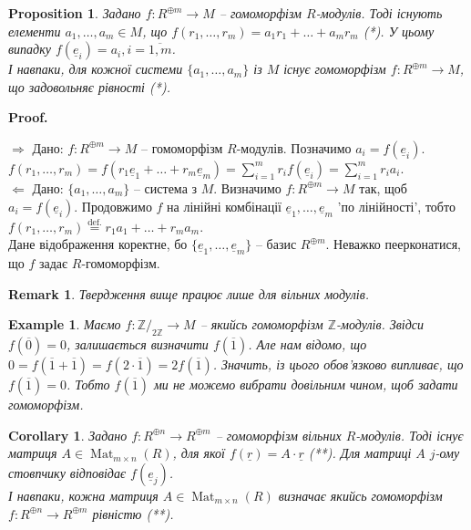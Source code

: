 \documentclass[a4paper, 10pt]{article}
\makeatletter
\def\rightproof{$\boxed{\Rightarrow}$ }
\def\leftproof{$\boxed{\Leftarrow}$ }
\theoremstyle{theoremdd}
\theoremstyle{theoremdd}
\theoremstyle{theoremdd}
\theoremstyle{theoremdd}
\theoremstyle{theoremdd}
\newtheorem{example}[theorem]{Example}
\theoremstyle{theoremdd}
\theoremstyle{theoremdd}
\theoremstyle{theoremdd}
\theoremstyle{theoremdd}
\newtheorem{proposition}[theorem]{Proposition}
\theoremstyle{theoremdd}
\theoremstyle{theoremdd}
\newtheorem{remark}[theorem]{Remark}
\theoremstyle{theoremdd}
\theoremstyle{theoremdd}
\theoremstyle{theoremdd}
\newtheorem{corollary}[theorem]{Corollary}
\theoremstyle{theoremdd}
\renewenvironment{proof}[1][Proof.\\]{\par
\pushQED{\hfill \qed}%
\normalfont \topsep6\p@\@plus6\p@\relax
\trivlist
\item\relax
{\bfseries
#1\@addpunct{.}}\hspace\labelsep\ignorespaces
}{%
\popQED\endtrivlist\@endpefalse
}
\DeclareMathOperator{\Mat}{Mat}
\makeatother
\begin{document}
\begin{proposition}
\label{construct_homomorphism_based_on_module_elements_and_vice_versa}
Задано $f \colon R^{\oplus m} \to M$ -- гомоморфізм $R$-модулів. Тоді існують елементи $a_1,\dots,a_m \in M$, що $f(r_1,\dots,r_m) = a_1 r_1 + \dots + a_m r_m$ (*). У цьому випадку $f(\underline{e}_i) = a_i, i = \overline{1,m}$.\\
І навпаки, для кожної системи $\{a_1,\dots,a_m\}$ із $M$ існує гомоморфізм $f \colon R^{\oplus m} \to M$, що задовольняє рівності (*).
\end{proposition}

\begin{proof}
\rightproof Дано: $f \colon R^{\oplus m} \to M$ -- гомоморфізм $R$-модулів. Позначимо $a_i = f(\underline{e}_i)$.\\
$f(r_1,\dots,r_m) = f(r_1 \underline{e}_1 + \dots + r_m \underline{e}_m) = \displaystyle\sum_{i=1}^m r_i f(\underline{e}_i) = \sum_{i=1}^m r_i a_i$.
\bigskip \\
\leftproof Дано: $\{a_1,\dots,a_m\}$ -- система з $M$. Визначимо $f \colon R^{\oplus m} \to M$ так, щоб $a_i = f(\underline{e}_i)$. Продовжимо $f$ на лінійні комбінації $\underline{e}_1,\dots,\underline{e}_m$ 'по лінійності', тобто\\
$f(r_1,\dots,r_m) \overset{\text{def.}}{=} r_1 a_1 + \dots + r_m a_m$.\\
Дане відображення коректне, бо $\{\underline{e}_1,\dots,\underline{e}_m\}$ -- базис $R^{\oplus m}$. Неважко пеерконатися, що $f$ задає $R$-гомоморфізм.
\end{proof}

\begin{remark}
Твердження вище працює лише для вільних модулів.
\end{remark}

\begin{example}
Маємо $f \colon \mathbb{Z}/_{2 \mathbb{Z}} \to M$ -- якийсь гомоморфізм $\mathbb{Z}$-модулів. Звідси $f(\overline{0}) = 0$, залишається визначити $f(\overline{1})$. Але нам відомо, що $0 = f(\overline{1}+\overline{1}) = f(2 \cdot \overline{1}) = 2 f(\overline{1})$. Значить, із цього обов'язково випливає, що $f(\overline{1}) = 0$. Тобто $f(\overline{1})$ ми не можемо вибрати довільним чином, щоб задати гомоморфізм.
\end{example}

\begin{corollary}
\label{homomorphism_matrix_representation}
Задано $f \colon R^{\oplus n} \to R^{\oplus m}$ -- гомоморфізм вільних $R$-модулів. Тоді існує матриця $A \in \Mat_{m \times n}(R)$, для якої $f(\underline{r}) = A \cdot \underline{r}$ (**). Для матриці $A$ $j$-ому стовпчику відповідає $f(\underline{e}_j)$.\\
І навпаки, кожна матриця $A \in \Mat_{m \times n}(R)$ визначає якийсь гомоморфізм $f \colon R^{\oplus n} \to R^{\oplus m}$ рівністю (**).
\end{corollary}
\end{document}
